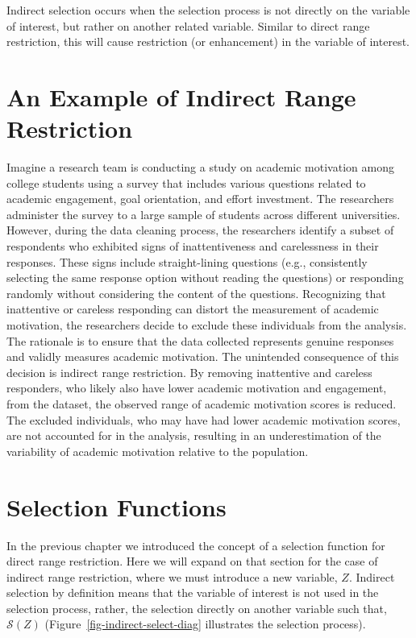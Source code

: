 \documentclass[
  letterpaper,
  DIV=11,
  numbers=noendperiod]{scrreprt}
\begin{document}
Indirect selection occurs when the selection process is not directly on
the variable of interest, but rather on another related variable.
Similar to direct range restriction, this will cause restriction (or
enhancement) in the variable of interest.

\section{An Example of Indirect Range
Restriction}\label{an-example-of-indirect-range-restriction}

Imagine a research team is conducting a study on academic motivation
among college students using a survey that includes various questions
related to academic engagement, goal orientation, and effort investment.
The researchers administer the survey to a large sample of students
across different universities. However, during the data cleaning
process, the researchers identify a subset of respondents who exhibited
signs of inattentiveness and carelessness in their responses. These
signs include straight-lining questions (e.g., consistently selecting
the same response option without reading the questions) or responding
randomly without considering the content of the questions. Recognizing
that inattentive or careless responding can distort the measurement of
academic motivation, the researchers decide to exclude these individuals
from the analysis. The rationale is to ensure that the data collected
represents genuine responses and validly measures academic motivation.
The unintended consequence of this decision is indirect range
restriction. By removing inattentive and careless responders, who likely
also have lower academic motivation and engagement, from the dataset,
the observed range of academic motivation scores is reduced. The
excluded individuals, who may have had lower academic motivation scores,
are not accounted for in the analysis, resulting in an underestimation
of the variability of academic motivation relative to the population.

\section{Selection Functions}\label{selection-functions}

In the previous chapter we introduced the concept of a selection
function for direct range restriction. Here we will expand on that
section for the case of indirect range restriction, where we must
introduce a new variable, \(Z\). Indirect selection by definition means
that the variable of interest is not used in the selection process,
rather, the selection directly on another variable such that,
\(\mathcal{S}(Z)\) (Figure~\ref{fig-indirect-select-diag} illustrates
the selection process).
\end{document}
